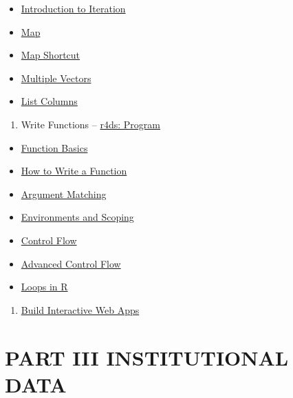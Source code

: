 \documentclass[
  xelatex, ja=standard]{bxjsbook}
\providecommand{\tightlist}{%
  \setlength{\itemsep}{0pt}\setlength{\parskip}{0pt}}
\theoremstyle{definition}
\theoremstyle{definition}
\theoremstyle{definition}
\theoremstyle{definition}
\theoremstyle{remark}
\begin{document}
\begin{itemize}
\tightlist
\item
  \href{https://rstudio.cloud/learn/primers/5.1}{Introduction to Iteration}
\item
  \href{https://rstudio.cloud/learn/primers/5.2}{Map}
\item
  \href{https://rstudio.cloud/learn/primers/5.3}{Map Shortcut}
\item
  \href{https://rstudio.cloud/learn/primers/5.3}{Multiple Vectors}
\item
  \href{https://rstudio.cloud/learn/primers/5.4}{List Columns}
\end{itemize}

\begin{enumerate}
\def\labelenumi{\arabic{enumi}.}
\setcounter{enumi}{5}
\tightlist
\item
  Write Functions -- \href{https://r4ds.had.co.nz/program-intro.html\#program-intro}{r4ds: Program}
\end{enumerate}

\begin{itemize}
\tightlist
\item
  \href{https://rstudio.cloud/learn/primers/6.1}{Function Basics}
\item
  \href{https://rstudio.cloud/learn/primers/6.2}{How to Write a Function}
\item
  \href{https://rstudio.cloud/learn/primers/6.3}{Argument Matching}
\item
  \href{https://rstudio.cloud/learn/primers/6.4}{Environments and Scoping}
\item
  \href{https://rstudio.cloud/learn/primers/6.5}{Control Flow}
\item
  \href{https://rstudio.cloud/learn/primers/6.6}{Advanced Control Flow}
\item
  \href{https://rstudio.cloud/learn/primers/6.7}{Loops in R}
\end{itemize}

\begin{enumerate}
\def\labelenumi{\arabic{enumi}.}
\setcounter{enumi}{7}
\tightlist
\item
  \href{https://shiny.rstudio.com/tutorial/?_ga=2.149795838.979535829.1639794069-1104332695.1639233659}{Build Interactive Web Apps}
\end{enumerate}

\hypertarget{part-part-iii-institutional-data}{%
\part{PART III INSTITUTIONAL DATA}\label{part-part-iii-institutional-data}}
\end{document}

